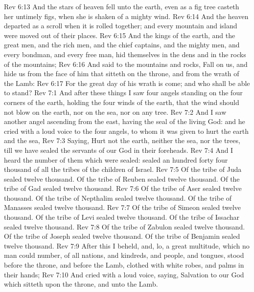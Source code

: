 \vs Rev 6:13 And the stars of heaven fell unto the earth, even as a fig tree casteth her untimely figs, when she is shaken of a mighty wind.
\vs Rev 6:14 And the heaven departed as a scroll when it is rolled together; and every mountain and island were moved out of their places.
\vs Rev 6:15 And the kings of the earth, and the great men, and the rich men, and the chief captains, and the mighty men, and every bondman, and every free man, hid themselves in the dens and in the rocks of the mountains;
\vs Rev 6:16 And said to the mountains and rocks, Fall on us, and hide us from the face of him that sitteth on the throne, and from the wrath of the Lamb:
\vs Rev 6:17 For the great day of his wrath is come; and who shall be able to stand?
\vs Rev 7:1 And after these things I saw four angels standing on the four corners of the earth, holding the four winds of the earth, that the wind should not blow on the earth, nor on the sea, nor on any tree.
\vs Rev 7:2 And I saw another angel ascending from the east, having the seal of the living God: and he cried with a loud voice to the four angels, to whom it was given to hurt the earth and the sea,
\vs Rev 7:3 Saying, Hurt not the earth, neither the sea, nor the trees, till we have sealed the servants of our God in their foreheads.
\vs Rev 7:4 And I heard the number of them which were sealed:  sealed an hundred  forty  four thousand of all the tribes of the children of Israel.
\vs Rev 7:5 Of the tribe of Juda  sealed twelve thousand. Of the tribe of Reuben  sealed twelve thousand. Of the tribe of Gad  sealed twelve thousand.
\vs Rev 7:6 Of the tribe of Aser  sealed twelve thousand. Of the tribe of Nepthalim  sealed twelve thousand. Of the tribe of Manasses  sealed twelve thousand.
\vs Rev 7:7 Of the tribe of Simeon  sealed twelve thousand. Of the tribe of Levi  sealed twelve thousand. Of the tribe of Issachar  sealed twelve thousand.
\vs Rev 7:8 Of the tribe of Zabulon  sealed twelve thousand. Of the tribe of Joseph  sealed twelve thousand. Of the tribe of Benjamin  sealed twelve thousand.
\vs Rev 7:9 After this I beheld, and, lo, a great multitude, which no man could number, of all nations, and kindreds, and people, and tongues, stood before the throne, and before the Lamb, clothed with white robes, and palms in their hands;
\vs Rev 7:10 And cried with a loud voice, saying, Salvation to our God which sitteth upon the throne, and unto the Lamb.
